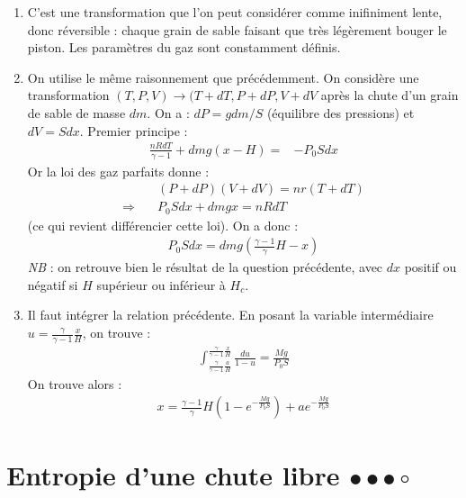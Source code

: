 \begin{correction}
\begin{enumerate}
\begin{enumerate}
\item C'est une transformation que l'on peut considérer comme inifiniment lente, donc réversible : chaque grain de sable faisant que très légèrement bouger le piston. Les paramètres du gaz sont constamment définis.

\item On utilise le même raisonnement que précédemment. On considère une transformation $(T,P,V)\longrightarrow(T+dT,P+dP,V+dV$ après la chute d'un grain de sable de masse $dm$. On a : $dP=gdm/S$ (équilibre des pressions) et $dV=Sdx$.
Premier principe :
\begin{align*}
	\frac{nRdT}{\gamma-1}+dmg(x-H)=&-P_0Sdx
\end{align*}
Or la loi des gaz parfaits donne :
\begin{align*}
& (P+dP)(V+dV)=nr(T+dT) \\
\Rightarrow \quad & P_0Sdx+dmgx=nRdT
\end{align*}
(ce qui revient différencier cette loi). 
On a donc :
\begin{align*}
P_0Sdx=dmg\left(\frac{\gamma-1}{\gamma}H-x \right) 
\end{align*}
\textit{NB} : on retrouve bien le résultat de la question précédente, avec $dx$ positif ou négatif si $H$ supérieur ou inférieur à $H_c$.

\item Il faut intégrer la relation précédente. En posant la variable intermédiaire $u=\frac{\gamma}{\gamma-1}\frac{x}{H}$, on trouve :
\begin{align*}
 \int_{\frac{\gamma}{\gamma-1}\frac{a}{H}}^{\frac{\gamma}{\gamma-1}\frac{x}{H}}\frac{du}{1-u}=\frac{Mg}{P_0S}
\end{align*}
On trouve alors :
\begin{align*}
x=\frac{\gamma-1}{\gamma}H(1-e^{-\frac{Mg}{P_0S}})+ae^{-\frac{Mg}{P_0S}}
\end{align*}

\end{enumerate}

\end{enumerate}

\end{correction}

\newpage	

\section{Entropie d'une chute libre $\bullet\bullet\bullet\circ$}

